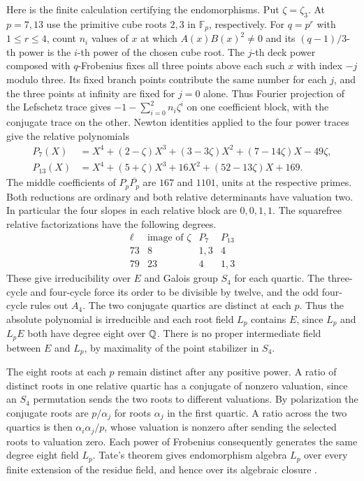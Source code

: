 Here is the finite calculation certifying the endomorphisms. Put
\(\zeta=\zeta_3\). At \(p=7,13\) use the primitive cube roots
\(2,3\) in \(\mathbb F_p\), respectively. For \(q=p^r\) with
\(1\le r\le4\), count \(n_i\) values of \(x\) at which
\(A(x)B(x)^2\ne0\) and its \((q-1)/3\)-th power is the \(i\)-th
power of the chosen cube root. The \(j\)-th deck power composed with
\(q\)-Frobenius fixes all three points above each such \(x\) with
index \(-j\) modulo three. Its fixed branch points contribute the
same number for each \(j\), and the three points at infinity are
fixed for \(j=0\) alone. Thus Fourier projection of the Lefschetz
trace gives \(-1-\sum_{i=0}^2n_i\zeta^i\) on one coefficient block,
with the conjugate trace on the other. Newton identities applied
to the four power traces give the relative polynomials
\[
\begin{aligned}
 P_7(X)&=X^4+(2-\zeta)X^3+(3-3\zeta)X^2
                    +(7-14\zeta)X-49\zeta,\\
 P_{13}(X)&=X^4+(5+\zeta)X^3+16X^2+(52-13\zeta)X+169.
\end{aligned}
\]
The middle coefficients of \(P_p\overline{P_p}\) are \(167\) and
\(1101\), units at the respective primes. Both reductions are
ordinary and both relative determinants have valuation two. In
particular the four slopes in each relative block are \(0,0,1,1\).
The squarefree relative factorizations have the following degrees.
\[
\begin{array}{c|c|cc}
\ell&\text{image of }\zeta&P_7&P_{13}\\ \hline
73&8&1,3&4\\
79&23&4&1,3
\end{array}
\]
These give irreducibility over \(E\) and Galois group \(S_4\) for
each quartic. The three-cycle and four-cycle force its order to be
divisible by twelve, and the odd four-cycle rules out \(A_4\).
The two conjugate quartics are distinct at each \(p\). Thus the
absolute polynomial is irreducible and each root field \(L_p\)
contains \(E\), since \(L_p\) and \(L_pE\) both have degree eight
over \(\mathbb Q\). There is no proper intermediate field between \(E\)
and \(L_p\), by maximality of the point stabilizer in \(S_4\).

The eight roots at each \(p\) remain distinct after any positive
power. A ratio of distinct roots in one relative quartic has a
conjugate of nonzero valuation, since an \(S_4\) permutation sends
the two roots to different valuations. By polarization the conjugate
roots are \(p/\alpha_j\) for roots \(\alpha_j\) in the first quartic.
A ratio across the two quartics is then \(\alpha_i\alpha_j/p\), whose
valuation is nonzero after sending the selected roots to valuation
zero. Each power of Frobenius consequently generates the same degree
eight field \(L_p\). Tate's theorem gives endomorphism algebra \(L_p\)
over every finite extension of the residue field, and hence over its
algebraic closure \cite[Theorem~2(c)]{tatefinite}.

